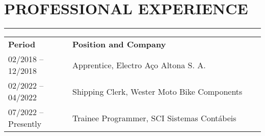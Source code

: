 \documentclass[11pt]{article}
\begin{document}
\vspace{1.0em}\section*{PROFESSIONAL EXPERIENCE}
\hrule
\begin{flushleft}
\begin{tabular}{p{0.25\linewidth}p{0.8\linewidth}}
    \vspace{0.1em}\textbf{Period} & \vspace{0.1em}\textbf{Position and Company} \\
    02/2018 -- 12/2018 & Apprentice, Electro Aço Altona S. A. \\
    02/2022 -- 04/2022 & Shipping Clerk, Wester Moto Bike Components \\
    07/2022 -- Presently & Trainee Programmer, SCI Sistemas Contábeis \\
\end{tabular}
\end{flushleft}
\end{document}
